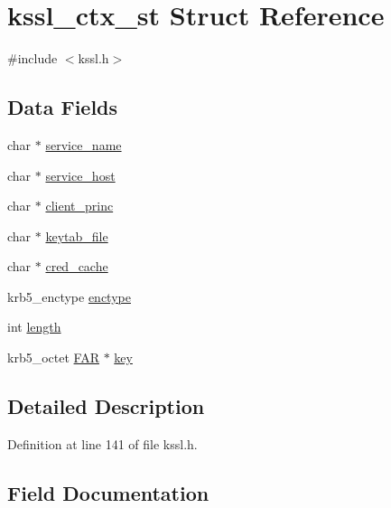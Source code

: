 \hypertarget{structkssl__ctx__st}{}\section{kssl\+\_\+ctx\+\_\+st Struct Reference}
\label{structkssl__ctx__st}


{\ttfamily \#include $<$kssl.\+h$>$}

\subsection*{Data Fields}
\begin{DoxyCompactItemize}
\item 
char $\ast$ \hyperlink{structkssl__ctx__st_a21e9949438c13fbae1fd7052c3a55f5b}{service\+\_\+name}
\item 
char $\ast$ \hyperlink{structkssl__ctx__st_aa20aecc83df023ab9789349f18105a30}{service\+\_\+host}
\item 
char $\ast$ \hyperlink{structkssl__ctx__st_a5bb55f72f736f9ee7e42ed125356d82e}{client\+\_\+princ}
\item 
char $\ast$ \hyperlink{structkssl__ctx__st_a0f6851816ce7ce88cd5da7c7ee4d1684}{keytab\+\_\+file}
\item 
char $\ast$ \hyperlink{structkssl__ctx__st_a4c907c639ed4624a5348145aad528ac5}{cred\+\_\+cache}
\item 
krb5\+\_\+enctype \hyperlink{structkssl__ctx__st_a124c9f8f81b5b087393178d2e6db691e}{enctype}
\item 
int \hyperlink{structkssl__ctx__st_a9f59b34b1f25fe00023291b678246bcc}{length}
\item 
krb5\+\_\+octet \hyperlink{ssl_2kssl_8h_aef060b3456fdcc093a7210a762d5f2ed}{F\+AR} $\ast$ \hyperlink{structkssl__ctx__st_af9dca1d1ed84c8f4ac054667cd04615b}{key}
\end{DoxyCompactItemize}


\subsection{Detailed Description}


Definition at line 141 of file kssl.\+h.



\subsection{Field Documentation}
